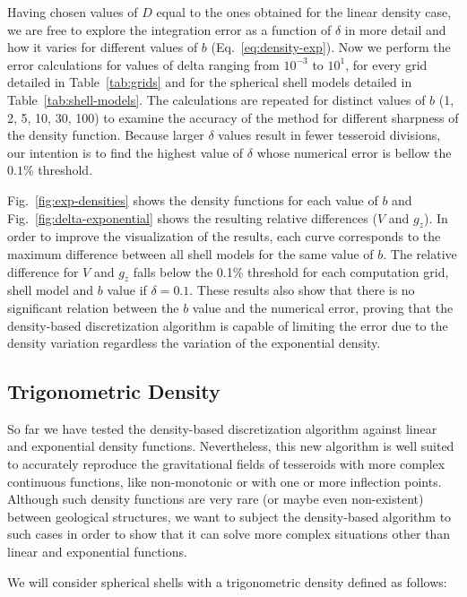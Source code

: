 \documentclass[extra, referee]{gji}
\begin{document}
Having chosen values of $D$ equal to the ones obtained for the linear density case, we
are free to explore the integration error as a function of $\delta$ in more detail and
how it varies for different values of $b$ (Eq.~\ref{eq:density-exp}).
Now we perform the error calculations for values of delta ranging from $10^{-3}$ to
$10^{1}$, for every grid detailed in Table~\ref{tab:grids} and for the spherical shell
models detailed in Table~\ref{tab:shell-models}.
The calculations are repeated for distinct values of $b$ (1, 2, 5, 10, 30, 100) to
examine the accuracy of the method for different sharpness of the density function.
Because larger $\delta$ values result in fewer tesseroid divisions,
our intention is to find the highest value of $\delta$ whose numerical error is bellow
the $0.1\%$ threshold.

Fig.~\ref{fig:exp-densities} shows the density functions for each value of $b$ and
Fig.~\ref{fig:delta-exponential} shows the resulting relative
differences ($V$ and $g_z$).
In order to improve the visualization of the results, each curve corresponds to the
maximum difference between all shell models for the same value of $b$.
The relative difference for $V$ and $g_z$ falls below the 0.1\% threshold
for each computation grid, shell model and $b$ value if $\delta = 0.1$.
These results also show that there is no significant relation between the $b$
value and the numerical error, proving that the density-based discretization algorithm
is capable of limiting the error due to the density variation regardless the variation
of the exponential density.


\subsection{Trigonometric Density}

So far we have tested the density-based discretization algorithm against linear and
exponential density functions.
Nevertheless, this new algorithm is well suited to accurately reproduce the
gravitational fields of tesseroids with more complex continuous functions, like
non-monotonic or with one or more inflection points.
Although such density functions are very rare (or maybe even non-existent) between
geological structures, we want to subject the density-based algorithm to such cases in
order to show that it can solve more complex situations other than linear and
exponential functions.

We will consider spherical shells with a trigonometric density defined as follows:
\end{document}
